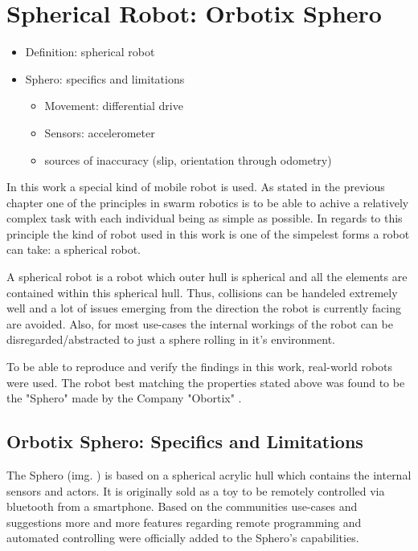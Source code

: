 \section{Spherical Robot: Orbotix Sphero}
\begin{itemize}
	\item{Definition: spherical robot}
	\item{Sphero: specifics and limitations}
	\begin{itemize}
		\item{Movement: differential drive}
		\item{Sensors: accelerometer}
		\item{sources of inaccuracy (slip, orientation through odometry)}
	\end{itemize}
\end{itemize}

In this work a special kind of mobile robot is used. As stated in the previous chapter  one of the principles in swarm robotics is to be able to achive a relatively complex task with each individual being as simple as possible. In regards to this principle the kind of robot used in this work is one of the simpelest forms a robot can take: a spherical robot.

A spherical robot is a robot which outer hull is spherical and all the elements are contained within this spherical hull. Thus, collisions can be handeled extremely well and a lot of issues  emerging from the direction the robot is currently facing are avoided. Also, for most use-cases the internal workings of the robot can be disregarded/abstracted  to just a sphere rolling in it's environment.

To be able to reproduce and verify the findings in this work, real-world robots were used. The robot best matching the properties stated above  was found to be the "Sphero" made by the Company "Obortix" .

\subsection{Orbotix Sphero: Specifics and Limitations}

The Sphero (img. ) is based on a spherical acrylic hull which contains the internal sensors and actors. It is originally sold as a toy to be remotely controlled via bluetooth from a smartphone. Based on the communities use-cases and suggestions more and more features regarding remote programming and automated controlling were officially added to the Sphero's capabilities.

